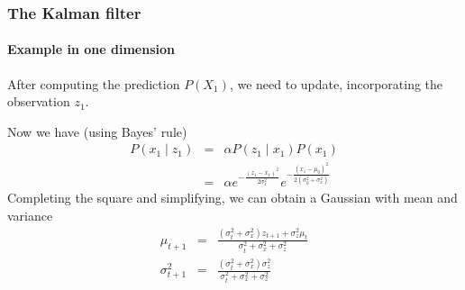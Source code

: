 \documentclass[aspectratio=169]{beamer}
\begin{document}
\begin{frame}
\frametitle{The Kalman filter}
\framesubtitle{Example in one dimension}

After computing the \alert{prediction} $P(X_1)$, we need to
\alert{update}, incorporating the observation $z_1$.

\medskip
Now we have (using Bayes' rule)
\begin{eqnarray*}
P(x_1 \mid z_1) & = & \alpha P(z_1 \mid x_1) P(x_1) \\
                & = & \alpha e^{
                -\frac{(z_1-x_1)^2}{2\sigma_z^2} } e^{
                -\frac{(x_1-\mu_0)^2}{2(\sigma_0^2+\sigma_x^2)}
                }
\end{eqnarray*}
Completing the square and simplifying, we can obtain a Gaussian with
mean and variance
\begin{eqnarray*}
\mu_{t+1} & = & \frac{( \sigma_t^2 + \sigma_x^2 ) z_{t+1} + \sigma_z^2
\mu_t}{ \sigma_t^2 + \sigma_x^2 + \sigma_z^2 } \\
\sigma_{t+1}^2 & = & \frac{(\sigma_t^2 + \sigma_x^2)\sigma_z^2}{\sigma_t^2
+ \sigma_x^2+\sigma_z^2}
\end{eqnarray*}

\end{frame}
\end{document}
